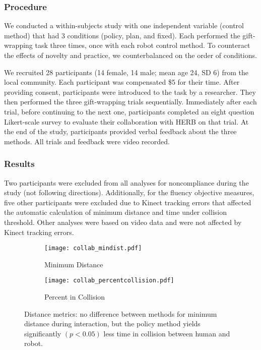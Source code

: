 \subsubsection{Procedure}
We conducted a within-subjects study with one independent variable (control method) that had 3 conditions (policy, plan, and fixed). Each performed the gift-wrapping task three times, once with each robot control method. To counteract the effects of novelty and practice, we counterbalanced on the order of conditions.

We recruited 28 participants (14 female, 14 male; mean age 24, SD 6) from the local community. Each participant was compensated \$5 for their time. After providing consent, participants were introduced to the task by a researcher. They then performed the three gift-wrapping trials sequentially. Immediately after each trial, before continuing to the next one, participants completed an eight question Likert-scale survey to evaluate their collaboration with HERB on that trial. At the end of the study, participants provided verbal feedback about the three methods. All trials and feedback were video recorded.


\subsubsection{Results}
\label{sec:results_iros_2016}
Two participants were excluded from all analyses for noncompliance during the study (not following directions). Additionally, for the fluency objective measures, five other participants were excluded due to Kinect tracking errors that affected the automatic calculation of minimum distance and time under collision threshold. Other analyses were based on video data and were not affected by Kinect tracking errors.

\begin{figure}[t]
	\centering
	\begin{subfigure}[t]{0.49\columnwidth}
		\texttt{[image: collab\_mindist.pdf]}
		\caption{Minimum Distance}
		\label{fig:result_mindist}
	\end{subfigure}
	\hfill
	\begin{subfigure}[t]{0.49\columnwidth}
		\texttt{[image: collab\_percentcollision.pdf]}
		\caption{Percent in Collision}
		\label{fig:result_percentcollision}
	\end{subfigure}
	\caption{Distance metrics: no difference between methods for minimum distance during interaction, but the policy method yields significantly $(p<0.05)$ less time in collision between human and robot.}
	\label{fig:distance}
\end{figure}

